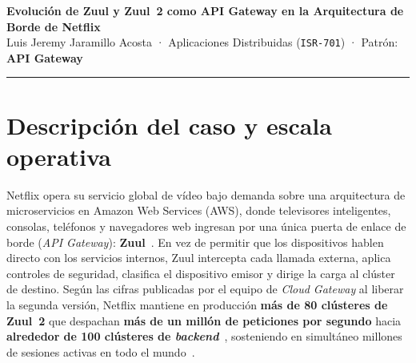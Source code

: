 \documentclass[10pt,a4paper]{article}
\begin{document}

\begin{center}
    {\large \textbf{Evolución de Zuul y Zuul~2 como API Gateway en la Arquitectura de Borde de Netflix}}\\[0.06cm]
    {\footnotesize Luis Jeremy Jaramillo Acosta · Aplicaciones Distribuidas (\texttt{ISR-701}) · Patrón: \textbf{API Gateway}}
\end{center}
\vspace{-0.18cm}
\rule{\linewidth}{0.35pt}
\vspace{-0.12cm}

\section{Descripción del caso y escala operativa}
Netflix opera su servicio global de vídeo bajo demanda sobre una arquitectura de microservicios en Amazon Web Services (AWS), donde televisores inteligentes, consolas, teléfonos y navegadores web ingresan por una única puerta de enlace de borde (\emph{API Gateway}): \textbf{Zuul}~\cite{cohen2013zuul,gonigberg2016zuul2}. En vez de permitir que los dispositivos hablen directo con los servicios internos, Zuul intercepta cada llamada externa, aplica controles de seguridad, clasifica el dispositivo emisor y dirige la carga al clúster de destino. Según las cifras publicadas por el equipo de \emph{Cloud Gateway} al liberar la segunda versión, Netflix mantiene en producción \textbf{más de 80 clústeres de Zuul~2} que despachan \textbf{más de un millón de peticiones por segundo} hacia \textbf{alrededor de 100 clústeres de \emph{backend}}~\cite{netflix2018opensourcing}, sosteniendo en simultáneo millones de sesiones activas en todo el mundo~\cite{gonigberg2016zuul2}.
\end{document}
